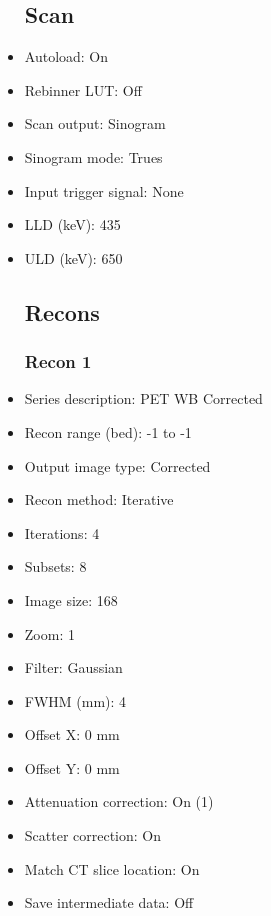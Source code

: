 \documentclass[12pt]{article}
\begin{document}
\begin{itemize}[noitemsep]
\subsection{Scan}
\item Autoload: On
\item Rebinner LUT: Off
\item Scan output: Sinogram
\item Sinogram mode: Trues
\item Input trigger signal: None
\item LLD (keV): 435
\item ULD (keV): 650
\subsection{Recons}
\subsubsection{Recon 1}
\item Series description: PET WB Corrected
\item Recon range (bed): -1 to -1
\item Output image type: Corrected
\item Recon method: Iterative
\item Iterations: 4
\item Subsets: 8
\item Image size: 168
\item Zoom: 1
\item Filter: Gaussian
\item FWHM (mm): 4
\item Offset X: 0 mm
\item Offset Y: 0 mm
\item Attenuation correction: On (1)
\item Scatter correction: On
\item Match CT slice location: On
\item Save intermediate data: Off

\end{itemize}
\end{document}
